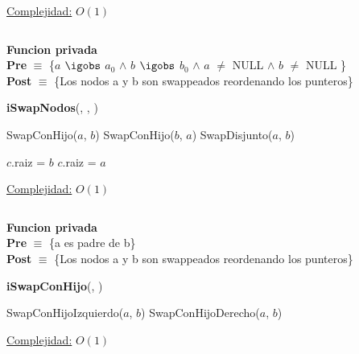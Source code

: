 \begin{Algoritmos}
\begin{algorithm}[H]
\begin{algorithmic}[1]
    \medskip
    \Statex \underline{Complejidad:} $O(1)$
\end{algorithmic}
\end{algorithm}



$ $\newline

\textbf{Funcion privada}\\
\textbf{Pre} $\equiv$ \{$a$ $\igobs$ $a_0$ $\land$ $b$ $\igobs$ $b_0$ $\land$ $a$ $\neq$ NULL $\land$ $b$ $\neq$ NULL \}\\%
\textbf{Post} $\equiv$ \{Los nodos a y b son swappeados reordenando los punteros\}%
\begin{algorithm}[H]
{\textbf{iSwapNodos}(, , )}
\begin{algorithmic}[1]

        \State SwapConHijo($a$, $b$)
    \Else
            \State SwapConHijo($b$, $a$) 
        \Else
            \State SwapDisjunto($a$, $b$)
        \EndIf 
    \EndIf 

        \State $c$.raiz = $b$ 
    \Else
            \State $c$.raiz = $a$
        \EndIf
    \EndIf

    \medskip
    \Statex \underline{Complejidad:} $O(1)$

\end{algorithmic}
\end{algorithm}




$ $\newline

\textbf{Funcion privada}\\
\textbf{Pre} $\equiv$ \{a es padre de b\}\\%
\textbf{Post} $\equiv$ \{Los nodos a y b son swappeados reordenando los punteros\}%
\begin{algorithm}[H]
{\textbf{iSwapConHijo}(, )}
\begin{algorithmic}[1]

        \State SwapConHijoIzquierdo($a$, $b$)
    \Else {}
            \State SwapConHijoDerecho($a$, $b$)
        \EndIf 
    \EndIf 

    \medskip
    \Statex \underline{Complejidad:} $O(1)$


\end{algorithmic}
\end{algorithm}
\end{Algoritmos}
